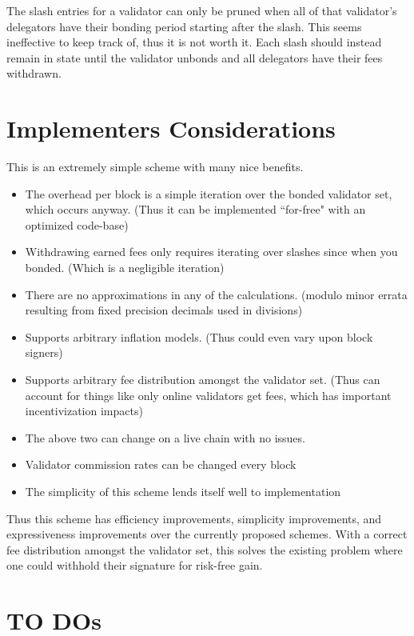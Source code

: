 \documentclass[]{article}
\begin{document}
The slash entries for a validator can only be pruned when all of that validator's delegators have their bonding period starting after the slash.
This seems ineffective to keep track of, thus it is not worth it.
Each slash should instead remain in state until the validator unbonds and all delegators have their fees withdrawn.

\section{Implementers Considerations}

This is an extremely simple scheme with many nice benefits. 
\begin{itemize}
	\item The overhead per block is a simple iteration over the bonded validator set, which occurs anyway. (Thus it can be implemented ``for-free" with an optimized code-base)
	\item Withdrawing earned fees only requires iterating over slashes since when you bonded. (Which is a negligible iteration)
	\item There are no approximations in any of the calculations. (modulo minor errata resulting from fixed precision decimals used in divisions)
	\item Supports arbitrary inflation models. (Thus could even vary upon block signers)
	\item Supports arbitrary fee distribution amongst the validator set. (Thus can account for things like only online validators get fees, which has important incentivization impacts)
	\item The above two can change on a live chain with no issues.
	\item Validator commission rates can be changed every block
	\item The simplicity of this scheme lends itself well to implementation
\end{itemize}

Thus this scheme has efficiency improvements, simplicity improvements, and expressiveness improvements over the currently proposed schemes. With a correct fee distribution amongst the validator set, this solves the existing problem where one could withhold their signature for risk-free gain.

\section{TO DOs}
\end{document}
